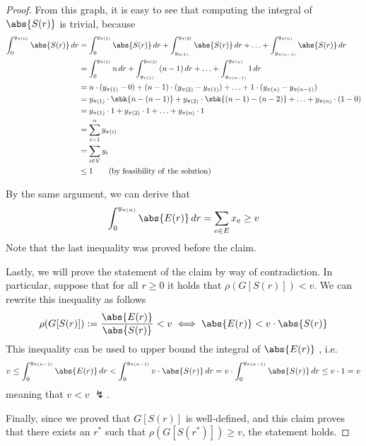 \documentclass[a4paper, 12pt]{report}
\begin{document}
\begin{proof}
{            From this graph, it is easy to see that computing the integral of $\abs{S(r)}$ is trivial, because
            \begin{equation*}
                \begin{split}
                    \int_{0}^{y_{\pi(n)}}{\abs{S(r)} \, d r} &= \int_{0}^{y_{\pi(1)}}{\abs{S(r)} \, dr} + \int_{y_{\pi(1)}}^{y_{\pi(2)}}{\abs{S(r)} \, dr} + \ldots + \int_{y_{\pi(n -1)}}^{y_{\pi(n)}}{\abs{S(r)} \, dr} \\
                                                             &= \int_{0}^{y_{\pi(1)}}{n \, dr} + \int_{y_{\pi(1)}}^{y_{\pi(2)}}{(n - 1) \, dr} + \ldots + \int_{y_{\pi(n - 1)}}^{y_{\pi(n)}}{1 \, dr} \\
                                                             &= n \cdot (y_{\pi(1)} - 0) + (n - 1) \cdot(y_{\pi(2)} - y_{\pi(1)}) + \ldots + 1 \cdot (y_{\pi(n)} - y_{\pi(n - 1)}) \\
                                                             &= y_{\pi(1)} \cdot\sbk{n - (n - 1)} + y_{\pi(2)}\cdot \sbk{(n - 1) - (n - 2)} + \ldots + y_{\pi(n)}\cdot (1 - 0) \\
                                                             &= y_{\pi(1)} \cdot 1 + y_{\pi(2)} \cdot 1 + \ldots + y_{\pi(n)} \cdot 1 \\
                                                             &= \sum_{i = 1}^n{y_{\pi(i)}} \\
                                                             &= \sum_{i \in V}{y_i} \\
                                                             &\le 1 \quad\quad (\mathrm{by \ feasibility \ of \ the \ solution})
                \end{split}
            \end{equation*}

            By the same argument, we can derive that $$\int_0^{y_{\pi(n)}}{\abs{E(r)} \, dr} = \sum_{e \in E}{x_e} \ge v$$ Note that the last inequality was proved before the claim.

            Lastly, we will prove the statement of the claim by way of contradiction. In particular, suppose that for all $r \ge 0$ it holds that $\rho(G[S(r)]) < v$. We can rewrite this inequality as follows $$\rho(G[S(r)]) := \dfrac{\abs{E(r)}}{\abs{S(r)}} < v \iff \abs{E(r)} < v \cdot \abs{S(r)}$$ This inequality can be used to upper bound the integral of $\abs{E(r)}$ , i.e. $$v \le \int_0^{y_{\pi(n - 1)}}{\abs{E(r)} \, dr} < \int_0^{y_{\pi(n - 1)}}{v \cdot \abs{S(r)} \, dr} = v \cdot \int_0^{y_{\pi(n - 1)}}{\abs{S(r)} \, dr} \le v \cdot 1 = v$$ meaning that $v < v$ $\lightning$.
        }

        Finally, since we proved that $G[S(r)]$ is well-defined, and this claim proves that there exists an $r^*$ such that $\rho(G[S(r^*)]) \ge v$, the statement holds.
    \end{proof}
\end{document}
